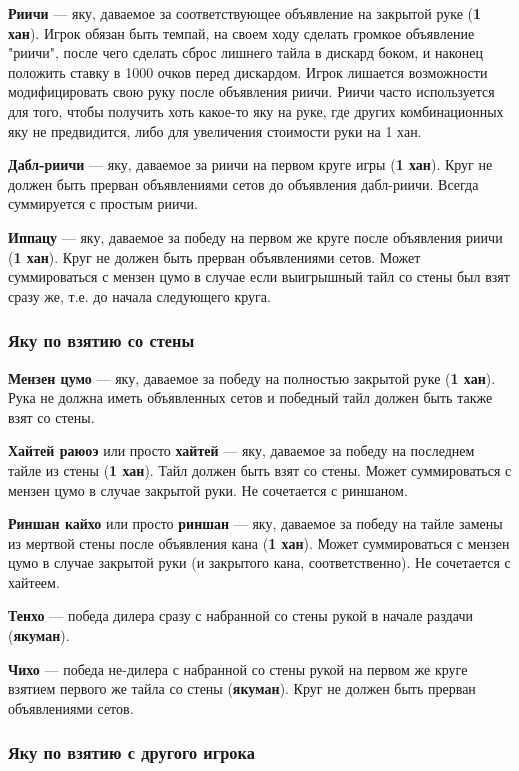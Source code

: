 \textbf{Риичи} --- яку, даваемое за соответствующее объявление на закрытой руке (\textbf{1 хан}). Игрок обязан быть темпай, на своем ходу сделать громкое объявление "риичи", после чего сделать сброс лишнего тайла в дискард боком, и наконец положить ставку в 1000 очков перед дискардом. Игрок лишается возможности модифицировать свою руку после объявления риичи. Риичи часто используется для того, чтобы получить хоть какое-то яку на руке, где других комбинационных яку не предвидится, либо для увеличения стоимости руки на 1 хан.

\textbf{Дабл-риичи} --- яку, даваемое за риичи на первом круге игры (\textbf{1 хан}). Круг не должен быть прерван объявлениями сетов до объявления дабл-риичи. Всегда суммируется с простым риичи.

\textbf{Иппацу} --- яку, даваемое за победу на первом же круге после объявления риичи (\textbf{1 хан}). Круг не должен быть прерван объявлениями сетов. Может суммироваться с мензен цумо в случае если выигрышный тайл со стены был взят сразу же, т.е. до начала следующего круга.

\subsubsection{Яку по взятию со стены}

\textbf{Мензен цумо} --- яку, даваемое за победу на полностью закрытой руке (\textbf{1 хан}). Рука не должна иметь объявленных сетов и победный тайл должен быть также взят со стены.

\textbf{Хайтей раюоэ} или просто \textbf{хайтей} --- яку, даваемое за победу на последнем тайле из стены (\textbf{1 хан}). Тайл должен быть взят со стены. Может суммироваться с мензен цумо в случае закрытой руки. Не сочетается с риншаном.

\textbf{Риншан кайхо} или просто \textbf{риншан} --- яку, даваемое за победу на тайле замены из мертвой стены после объявления кана (\textbf{1 хан}). Может суммироваться с мензен цумо в случае закрытой руки (и закрытого кана, соответственно). Не сочетается с хайтеем.

\textbf{Тенхо} --- победа дилера сразу с набранной со стены рукой в начале раздачи (\textbf{якуман}).

\textbf{Чихо} --- победа не-дилера с набранной со стены рукой на первом же круге взятием первого же тайла со стены (\textbf{якуман}). Круг не должен быть прерван объявлениями сетов.

\subsubsection{Яку по взятию с другого игрока}

